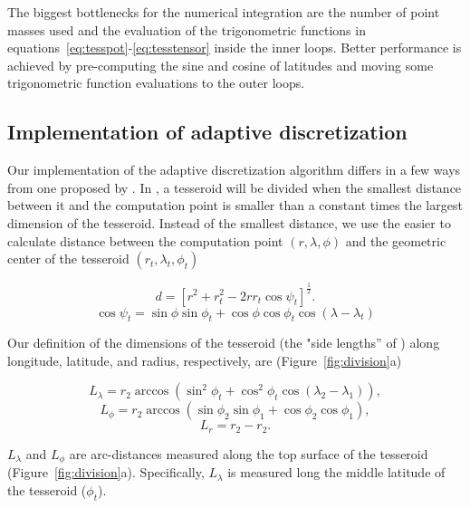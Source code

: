 \documentclass[paper,twocolumn,twoside]{geophysics}
\begin{document}
The biggest bottlenecks for the numerical integration are
the number of point masses used
and the evaluation of the trigonometric functions in
equations~\ref{eq:tesspot}-\ref{eq:tesstensor} inside the inner loops.
Better performance is achieved
by pre-computing the sine and cosine of latitudes
and moving some trigonometric function evaluations
to the outer loops.


\subsection{Implementation of adaptive discretization}

Our implementation of the adaptive discretization algorithm
differs in a few ways from one proposed by \citet{Li2011}.
In \citet{Li2011},
a tesseroid will be divided when
the smallest distance between it and the computation point
is smaller than a constant times
the largest dimension of the tesseroid.
Instead of the smallest distance,
we use the easier to calculate
distance between
the computation point $(r, \lambda, \phi)$
and the geometric center of the tesseroid
$(r_t, \lambda_t, \phi_t)$

\begin{equation}
    d = \left[
        r^2 + r_t^2 - 2 r r_t \cos\psi_t
        \right]^{\frac{1}{2}}.
    \label{eq:distance}
\end{equation}
\begin{equation}
    \cos\psi_t =
        \sin\phi\sin\phi_t + \cos\phi\cos\phi_t\cos(\lambda - \lambda_t)
\end{equation}

Our definition of the dimensions of the tesseroid
(the "side lengths'' of \citet{Li2011})
along longitude, latitude, and radius, respectively, are
(Figure~\ref{fig:division}a)

\begin{equation}
    L_\lambda = r_2 \arccos(\sin^2\phi_t +
        \cos^2\phi_t\cos(\lambda_2 - \lambda_1)),
    \label{eq:sizelon}
\end{equation}
\begin{equation}
    L_\phi = r_2 \arccos(\sin\phi_2\sin\phi_1 + \cos\phi_2\cos\phi_1),
\end{equation}
\begin{equation}
    L_r = r_2 - r_2.
    \label{eq:sizer}
\end{equation}

\noindent
$L_\lambda$ and $L_\phi$ are arc-distances measured along the top surface of
the tesseroid (Figure~\ref{fig:division}a).
Specifically, $L_\lambda$ is measured long the middle latitude of the
tesseroid ($\phi_t$).
\end{document}
